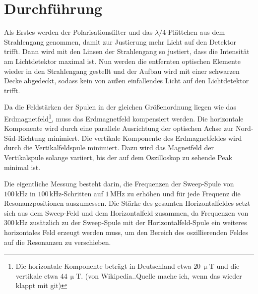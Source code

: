 \section{Durchführung}
Als Erstes werden der Polarisationsfilter und das $\lambda/4$-Plättchen aus dem Strahlengang genommen, damit zur Justierung mehr Licht auf den Detektor trifft.
Dann wird mit den Linsen der Strahlengang so justiert, dass die Intensität am Lichtdetektor maximal ist.
Nun werden die entfernten optischen Elemente wieder in den Strahlengang gestellt und der
Aufbau wird mit einer schwarzen Decke abgedeckt, sodass kein von außen
einfallendes Licht auf den Lichtdetektor trifft.

Da die Feldstärken der Spulen in der gleichen Größenordnung liegen wie das
Erdmagnetfeld\footnote{Die horizontale Komponente beträgt in Deutschland etwa
 $20\,\upmu\text{T}$ und die vertikale etwa $44\,\upmu\text{T}$. (von Wikipedia..Quelle mache ich, wenn das wieder klappt mit git)},
 muss das Erdmagnetfeld kompensiert werden. Die horizontale Komponente
 wird durch eine parallele Ausrichtung der optischen Achse zur Nord-Süd-Richtung minimiert.
 Die vertikale Komponente des Erdmagnetfeldes wird durch die Vertikalfeldspule minimiert.
 Dazu wird das Magnetfeld der Vertikalspule solange variiert, bis der auf dem Oszilloskop zu sehende Peak minimal ist.

 Die eigentliche Messung besteht darin, die Frequenzen der Sweep-Spule von  $100\,\text{kHz}$ in $100\,\text{kHz}$-Schritten auf $1\,\text{MHz}$ zu
 erhöhen und für jede Frequenz die Resonanzpositionen auszumessen.
 Die Stärke des gesamten Horizontalfeldes setzt sich aus dem Sweep-Feld und dem Horizontalfeld zusammen, da Frequenzen von
 $300\,\text{kHz}$ zusätzlich zu der Sweep-Spule mit der Horizontalfeld-Spule ein weiteres horizontales Feld erzeugt werden muss,
 um den Bereich des oszillierenden Feldes auf die Resonanzen zu verschieben.
